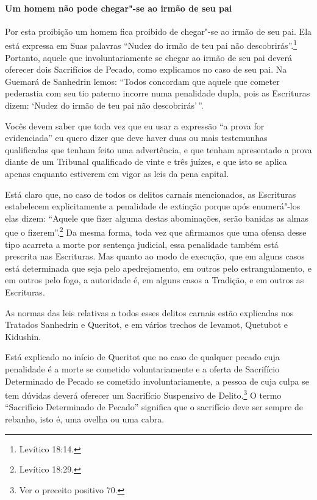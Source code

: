 \begin{multicols}{2}
\paragraph{Um homem não pode chegar"-se ao irmão de seu pai}

Por esta proibição um homem fica proibido de chegar"-se ao irmão de seu
pai. Ela está expressa em Suas palavras ``Nudez do irmão de teu pai não
descobrirás''.\footnote{Levítico 18:14.} Portanto, aquele que involuntariamente
se chegar ao irmão de seu pai deverá oferecer dois Sacrifícios de
Pecado, como explicamos no caso de seu pai. Na Guemará\starr{} de Sanhedrin\starr{}
lemos: ``Todos concordam que aquele que cometer pederastia com seu tio
paterno incorre numa penalidade dupla, pois as Escrituras dizem: `Nudez
do irmão de teu pai não descobrirás'\,''.

Vocês devem saber que toda vez que eu usar a expressão ``a prova
for evidenciada'' eu quero dizer que deve haver duas ou mais testemunhas
qualificadas que tenham feito uma advertência, e que tenham apresentado
a prova diante de um Tribunal qualificado de vinte e três juízes, e que
isto se aplica apenas enquanto estiverem em vigor as leis da pena
capital.

Está claro que, no caso de todos os delitos carnais mencionados, as
Escrituras estabelecem explicitamente a penalidade de extinção porque
após enumerá"-los elas dizem: ``Aquele que fizer alguma destas
abominações, serão banidas as almas que o fizerem''.\footnote{Levítico 18:29.} Da
mesma forma, toda vez que afirmamos que uma ofensa desse tipo acarreta a
morte por sentença judicial, essa penalidade também está prescrita nas
Escrituras. Mas quanto ao modo de execução, que em alguns casos está
determinada que seja pelo apedrejamento, em outros pelo estrangulamento,
e em outros pelo fogo, a autoridade é, em alguns casos a Tradição, e em
outros as Escrituras.

As normas das leis relativas a todos esses delitos carnais estão
explicadas nos Tratados Sanhedrin\starr{} e Queritot\starr, e em vários trechos de
Ievamot\starr, Quetubot\starr{} e Kidushin\starr.

Está explicado no início de Queritot\starr{} que no caso de qualquer pecado
cuja penalidade é a morte se cometido voluntariamente e a oferta de
Sacrifício Determinado de Pecado se cometido involuntariamente, a
pessoa de cuja culpa se tem dúvidas deverá oferecer um Sacrifício
Suspensivo de Delito.\footnote{Ver o preceito positivo 70.} O termo ``Sacrifício
Determinado de Pecado'' significa que o sacrifício deve ser sempre de
rebanho, isto é, uma ovelha ou uma cabra.


\end{multicols}
